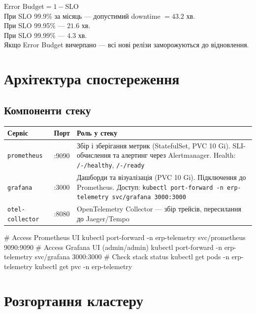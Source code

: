 \documentclass[12pt,a4paper]{article}
\let\originalfootnotesize\footnotesize
\let\oldverbatim\verbatim
\let\oldendverbatim\endverbatim
\renewenvironment{verbatim}{\originalfootnotesize\oldverbatim}{\oldendverbatim}
\begin{document}
\begin{tcolorbox}[notebox]
$\displaystyle\text{Error Budget} = 1 - \text{SLO}$\\[6pt]
При SLO 99.9\% за місяць --- допустимий downtime $= \mathbf{43.2}$ хв.\\
При SLO 99.95\% --- $\mathbf{21.6}$ хв.\\
При SLO 99.99\% --- $\mathbf{4.3}$ хв.\\[6pt]
Якщо Error Budget вичерпано --- всі нові релізи заморожуються до відновлення.
\end{tcolorbox}

\newpage
\section{Архітектура спостереження}

\subsection{Компоненти стеку}

\begin{longtable}{L{3.2cm} L{1.8cm} L{9cm}}
\toprule
{}
\color{primary}\textbf{Сервіс} &
\color{primary}\textbf{Порт} &
\color{primary}\textbf{Роль у стеку} \\
\midrule\endhead\bottomrule\endfoot
\texttt{prometheus}     & :9090 & Збір і зберігання метрик (StatefulSet, PVC 10 Gi).
  SLI-обчислення та алертинг через Alertmanager.
  Health: \texttt{/-/healthy}, \texttt{/-/ready} \\[4pt]
\texttt{grafana} & :3000 & Дашборди та візуалізація (PVC 10 Gi).
  Підключення до Prometheus.
  Доступ: \texttt{kubectl port-forward -n erp-telemetry svc/grafana 3000:3000} \\[4pt]
\texttt{otel-collector} & :8080 & OpenTelemetry Collector --- збір трейсів,
  пересилання до Jaeger/Tempo \\[4pt]
\end{longtable}

\begin{verbatim}
# Access Prometheus UI
kubectl port-forward -n erp-telemetry svc/prometheus 9090:9090
# Access Grafana UI (admin/admin)
kubectl port-forward -n erp-telemetry svc/grafana 3000:3000
# Check stack status
kubectl get pods -n erp-telemetry
kubectl get pvc  -n erp-telemetry
\end{verbatim}

\newpage
\section{Розгортання кластеру}
\end{document}
